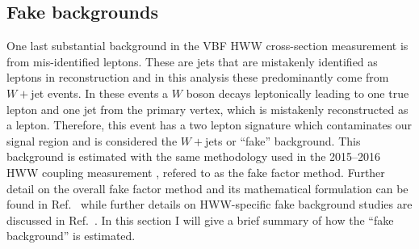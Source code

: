 \subsection{Fake backgrounds}
One last substantial background in the VBF HWW cross-section measurement is from mis-identified leptons. These are jets that are mistakenly identified as leptons in reconstruction and in this analysis these predominantly come from $W+$jet events. In these events a $W$ boson decays leptonically leading to one true lepton and one jet from the primary vertex, which is mistakenly reconstructed as a lepton. Therefore, this event has a two lepton signature which contaminates our signal region and is considered the $W+$jets or ``fake'' background. This background is estimated with the same methodology used in the 2015--2016 HWW coupling measurement \cite{Aaboud_2019},  refered to as the fake factor method. Further detail on the overall fake factor method and its mathematical formulation can be found in Ref.~\cite{fakefactormethod} while further details on HWW-specific fake background studies are discussed in Ref.~\cite{Aaboud_2019}. In this section I will give a brief summary of how the ``fake background'' is estimated. 

